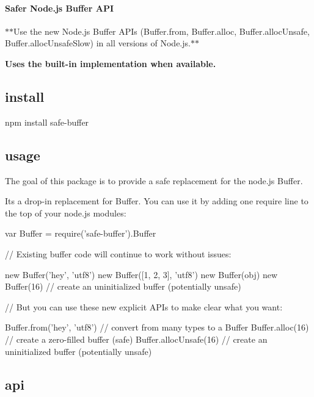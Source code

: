 \paragraph*{Safer Node.\+js Buffer A\+PI}

$\ast$$\ast$\+Use the new Node.\+js Buffer A\+P\+Is ({\ttfamily Buffer.\+from}, {\ttfamily Buffer.\+alloc}, {\ttfamily Buffer.\+alloc\+Unsafe}, {\ttfamily Buffer.\+alloc\+Unsafe\+Slow}) in all versions of Node.\+js.$\ast$$\ast$

{\bfseries Uses the built-\/in implementation when available.}

\subsection*{install}


\begin{DoxyCode}
npm install safe-buffer
\end{DoxyCode}


\subsection*{usage}

The goal of this package is to provide a safe replacement for the node.\+js {\ttfamily Buffer}.

It\textquotesingle{}s a drop-\/in replacement for {\ttfamily Buffer}. You can use it by adding one {\ttfamily require} line to the top of your node.\+js modules\+:


\begin{DoxyCode}
var Buffer = require('safe-buffer').Buffer

// Existing buffer code will continue to work without issues:

new Buffer('hey', 'utf8')
new Buffer([1, 2, 3], 'utf8')
new Buffer(obj)
new Buffer(16) // create an uninitialized buffer (potentially unsafe)

// But you can use these new explicit APIs to make clear what you want:

Buffer.from('hey', 'utf8') // convert from many types to a Buffer
Buffer.alloc(16) // create a zero-filled buffer (safe)
Buffer.allocUnsafe(16) // create an uninitialized buffer (potentially unsafe)
\end{DoxyCode}


\subsection*{api}

